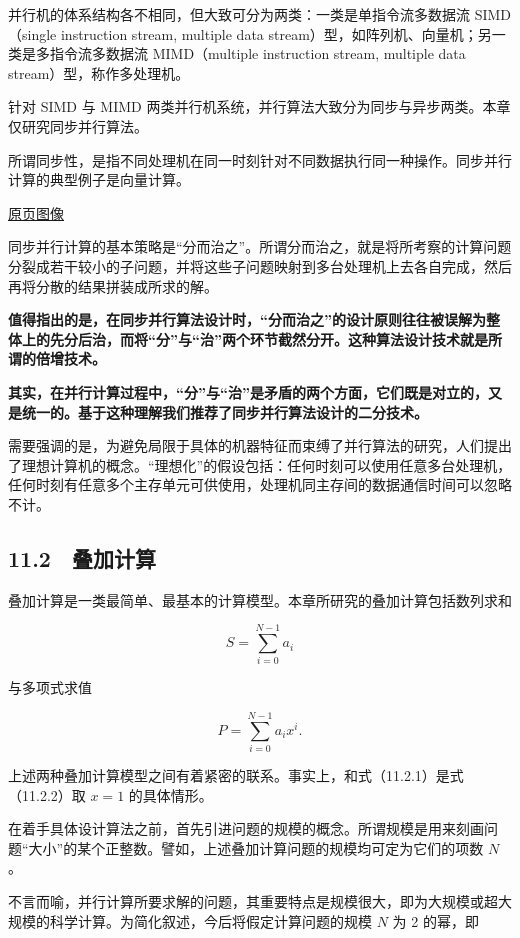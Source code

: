 \documentclass[
  10pt,
  fontset=fandol]{ctexart}
\begin{document}
并行机的体系结构各不相同，但大致可分为两类：一类是单指令流多数据流 SIMD（single instruction stream, multiple data stream）型，如阵列机、向量机；另一类是多指令流多数据流 MIMD（multiple instruction stream, multiple data stream）型，称作多处理机。

针对 SIMD 与 MIMD 两类并行机系统，并行算法大致分为同步与异步两类。本章仅研究同步并行算法。

所谓同步性，是指不同处理机在同一时刻针对不同数据执行同一种操作。同步并行计算的典型例子是向量计算。

\href{../../source-images/pdf-278.jpeg}{原页图像}

同步并行计算的基本策略是``分而治之''。所谓分而治之，就是将所考察的计算问题分裂成若干较小的子问题，并将这些子问题映射到多台处理机上去各自完成，然后再将分散的结果拼装成所求的解。

\textbf{值得指出的是，在同步并行算法设计时，``分而治之''的设计原则往往被误解为整体上的先分后治，而将``分''与``治''两个环节截然分开。这种算法设计技术就是所谓的倍增技术。}

\textbf{其实，在并行计算过程中，``分''与``治''是矛盾的两个方面，它们既是对立的，又是统一的。基于这种理解我们推荐了同步并行算法设计的二分技术。}

需要强调的是，为避免局限于具体的机器特征而束缚了并行算法的研究，人们提出了理想计算机的概念。``理想化''的假设包括：任何时刻可以使用任意多台处理机，任何时刻有任意多个主存单元可供使用，处理机同主存间的数据通信时间可以忽略不计。

\subsection{11.2　叠加计算}\label{ux53e0ux52a0ux8ba1ux7b97}

叠加计算是一类最简单、最基本的计算模型。本章所研究的叠加计算包括数列求和

\[
S=\sum_{i=0}^{N-1}a_i
\tag{11.2.1}
\]

与多项式求值

\[
P=\sum_{i=0}^{N-1}a_i x^i.
\tag{11.2.2}
\]

上述两种叠加计算模型之间有着紧密的联系。事实上，和式（11.2.1）是式（11.2.2）取 \(x=1\) 的具体情形。

在着手具体设计算法之前，首先引进问题的规模的概念。所谓规模是用来刻画问题``大小''的某个正整数。譬如，上述叠加计算问题的规模均可定为它们的项数 \(N\)。

不言而喻，并行计算所要求解的问题，其重要特点是规模很大，即为大规模或超大规模的科学计算。为简化叙述，今后将假定计算问题的规模 \(N\) 为 2 的幂，即
\end{document}
